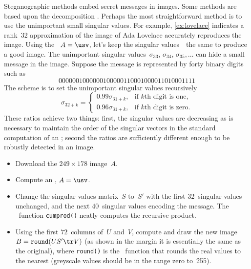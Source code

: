 \begin{exercise} \label{ex:} 
 Steganographic methods embed secret messages in images.
Some methods are based upon the  decomposition \cite[e.g.]{Gorodetski2001}. %
Perhaps the most straightforward method is to use the unimportant small singular values.
For example, \autoref{ex:lovelace} indicates a rank~32 approximation of the image of Ada Lovelace accurately reproduces the image.
Using the \svd\ \(A=\usv\), let's keep the singular values~\hlist{}\ the same to produce a good image.
The unimportant singular values~\(\sigma_{33}\), \(\sigma_{34}\), \(\sigma_{35},\ldots\) can hide a small message in the image.
Suppose the message is represented by forty binary digits such as
\begin{equation*}
0000001000000100000110001000011010001111
\end{equation*}
The scheme is to set the unimportant singular values recursively
\begin{equation*}
\sigma_{32+k}=\begin{cases}0.99\sigma_{31+k},
&\text{if \(k\)th digit is one},
\\0.96\sigma_{31+k},
&\text{if \(k\)th digit is zero}.
\end{cases}
\end{equation*}
These ratios achieve two things: first, the singular values are decreasing as is necessary to maintain the order of the singular vectors in the standard computation of an \svd; second the ratios are sufficiently different enough to be robustly detected in an image.
\begin{itemize}
\item Download the \(249\times178\) image~\(A\).

\item Compute an \svd, \(A=\usv\).

\item Change the singular values matrix~\(S\) to~\(S'\) with the first \(32\)~singular values unchanged, and the next \(40\)~singular values encoding the message.
The \script\ function \verb|cumprod()| neatly computes the recursive product.

\item Using the first \(72\)~columns of~\(U\) and~\(V\), compute and draw the new image \(B=\verb|round|(US'\tr V)\) (as shown in the margin it is essentially the same as the original),
%
where \verb|round()| is the \script\ function that rounds the real values to the nearest  (greyscale values should be in the range zero to~255). 


\end{itemize}
\end{exercise}
